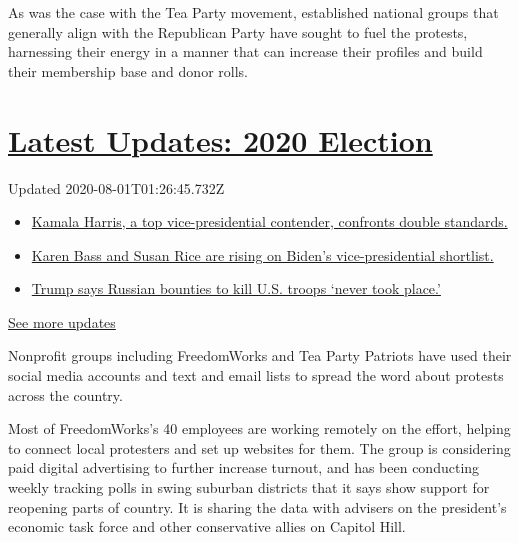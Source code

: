 As was the case with the Tea Party movement, established national groups
that generally align with the Republican Party have sought to fuel the
protests, harnessing their energy in a manner that can increase their
profiles and build their membership base and donor rolls.

\hypertarget{latest-updates-2020-election}{%
\section{\texorpdfstring{\href{https://www.nytimes.com/2020/07/31/us/elections/biden-vs-trump.html?action=click\&pgtype=Article\&state=default\&region=MAIN_CONTENT_1\&context=storylines_live_updates}{Latest
Updates: 2020
Election}}{Latest Updates: 2020 Election}}\label{latest-updates-2020-election}}

Updated 2020-08-01T01:26:45.732Z

\begin{itemize}
\tightlist
\item
  \href{https://www.nytimes.com/2020/07/31/us/elections/biden-vs-trump.html?action=click\&pgtype=Article\&state=default\&region=MAIN_CONTENT_1\&context=storylines_live_updates\#link-29fdff45}{Kamala
  Harris, a top vice-presidential contender, confronts double
  standards.}
\item
  \href{https://www.nytimes.com/2020/07/31/us/elections/biden-vs-trump.html?action=click\&pgtype=Article\&state=default\&region=MAIN_CONTENT_1\&context=storylines_live_updates\#link-13ec3d9c}{Karen
  Bass and Susan Rice are rising on Biden's vice-presidential
  shortlist.}
\item
  \href{https://www.nytimes.com/2020/07/31/us/elections/biden-vs-trump.html?action=click\&pgtype=Article\&state=default\&region=MAIN_CONTENT_1\&context=storylines_live_updates\#link-49e9a016}{Trump
  says Russian bounties to kill U.S. troops `never took place.'}
\end{itemize}

\href{https://www.nytimes.com/2020/07/31/us/elections/biden-vs-trump.html?action=click\&pgtype=Article\&state=default\&region=MAIN_CONTENT_1\&context=storylines_live_updates}{See
more updates}

Nonprofit groups including FreedomWorks and Tea Party Patriots have used
their social media accounts and text and email lists to spread the word
about protests across the country.

Most of FreedomWorks's 40 employees are working remotely on the effort,
helping to connect local protesters and set up websites for them. The
group is considering paid digital advertising to further increase
turnout, and has been conducting weekly tracking polls in swing suburban
districts that it says show support for reopening parts of country. It
is sharing the data with advisers on the president's economic task force
and other conservative allies on Capitol Hill.


